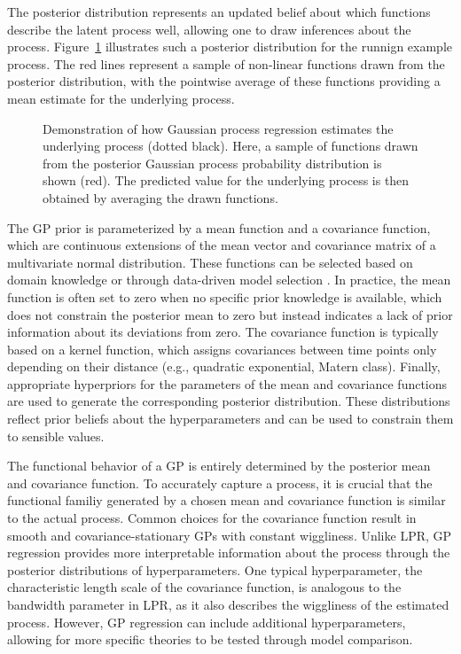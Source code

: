 \documentclass[man, floatsintext]{apa7}
\begin{document}
The posterior distribution represents an updated belief about which functions
describe the latent process well, allowing one to draw inferences about the
process. Figure~\ref{fig:gp_dem} illustrates such a posterior distribution
for the runnign
example process. The red lines represent a sample of non-linear functions
drawn from the posterior distribution, with the pointwise average of these
functions providing a mean estimate for the underlying process.

\begin{figure}[!ht]
  \caption{Demonstration of how Gaussian process regression estimates the
    underlying process (dotted black). Here, a sample of functions drawn from
    the
    posterior Gaussian process probability distribution is shown (red). The
    predicted value for the underlying process is then obtained by averaging
    the
    drawn functions.}
  \label{fig:gp_dem}
\end{figure}

The GP prior is parameterized by a mean function and a covariance function,
which are continuous extensions of the mean vector and covariance matrix of a
multivariate normal distribution. These functions can be selected based on
domain knowledge or through data-driven model selection
\parencite{richardson_gaussian_2017, abdessalem_automatic_2017}. In practice,
the mean function is often set to zero when no specific prior knowledge is
available, which does not constrain the posterior mean to zero but instead
indicates a lack of prior information about its deviations from zero.
The covariance function is typically based on a kernel function, which assigns
covariances between time points only depending on their distance
(e.g., quadratic exponential, Matern class). Finally, appropriate hyperpriors
for the parameters of the mean and covariance functions are used to generate
the corresponding posterior distribution. These distributions reflect
prior beliefs about the hyperparameters and can be used to constrain them to
sensible values.

The functional behavior of a GP is entirely determined by the posterior mean
and covariance function. To accurately capture a process, it is crucial
that the functional familiy generated by a chosen mean and covariance function
is similar to the actual process.
Common choices for the covariance function result in smooth and
covariance-stationary GPs with constant wiggliness. Unlike LPR, GP
regression provides more interpretable information about the process through
the posterior distributions of hyperparameters.
One typical hyperparameter, the characteristic length scale of the covariance
function, is analogous to the bandwidth parameter in LPR, as it also describes
the wiggliness of the estimated process. However, GP regression can
include additional hyperparameters, allowing for more specific theories to be
tested through model comparison.
\end{document}
